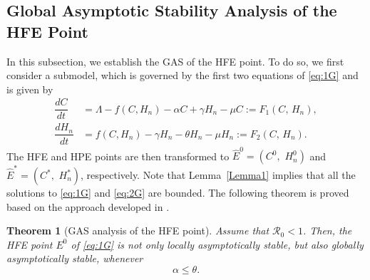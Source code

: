 \documentclass[11pt]{article}
\newtheorem{theorem}{Theorem}[section]
\theoremstyle{definition}
\theoremstyle{remark}
\numberwithin{equation}{section}
\begin{document}
\subsection{Global Asymptotic Stability Analysis of the HFE Point}\label{Subsec3.3}
In this subsection, we establish the GAS of the HFE point.
To do so, we first consider a submodel, which is governed by the first two equations of \eqref{eq:1G} and is given by
\begin{equation}\label{eq:2G}
\begin{split}
 \dfrac{dC}{dt} &= \Lambda - f(C, H_n) -\alpha C + \gamma H_n -\mu C := F_1(C,\,H_n), \\
 \dfrac{dH_n}{dt} &= f(C, H_n) - \gamma H_n - \theta H_n - \mu H_n := F_2(C,\,H_n).
\end{split}
\end{equation}
The HFE and HPE points are then transformed to $\widehat{E}^0 = (C^0,\,\,H_n^0)$ and $\widehat{E}^* = (C^*,\,\,H_n^*)$, respectively. 
Note that Lemma~\ref{Lemma1} implies that all the solutions to \eqref{eq:1G} and \eqref{eq:2G} are bounded.
%
The following theorem is proved based on the approach developed in \cite{Castillo-Chavez}.
\begin{theorem}[GAS analysis of the HFE point]\label{Theorem3new}
Assume that $\mathcal{R}_0 < 1$. 
Then, the HFE point $E^0$ of \eqref{eq:1G} is not only locally asymptotically stable, but also globally asymptotically stable, whenever
\begin{equation}\label{eq:17new}
\alpha \le\theta.
\end{equation}
\end{theorem}
\end{document}

